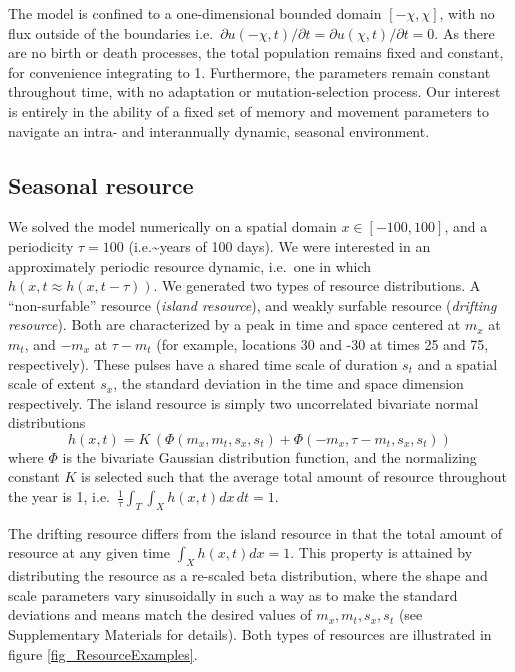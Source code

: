 \documentclass[utf8]{frontiersSCNS} %
\begin{document}
	The model is confined to a one-dimensional bounded domain $[-\chi,\chi]$, with no flux outside of the boundaries i.e.~${\partial u(-\chi,t)}/{\partial t} = {\partial u(\chi,t)}/{\partial t} =0$. As there are no birth or death processes, the total population remains fixed and constant, for convenience integrating to 1. Furthermore, the parameters remain constant throughout time, with no adaptation or mutation-selection process. Our interest is entirely in the ability of a fixed set of memory and movement parameters to navigate an intra- and interannually dynamic, seasonal environment.
	
	\subsection{Seasonal resource}
	
	We solved the model numerically on a spatial domain $x \in [-100,100]$, and a periodicity $\tau = 100$ (i.e.\textasciitilde years of 100 days). We were interested in an approximately periodic resource dynamic, i.e.~one in which $h(x,t \approx h(x, t-\tau))$. We generated two types of resource distributions. A ``non-surfable'' resource (\emph{island resource}), and weakly surfable resource (\emph{drifting resource}). Both are characterized by a peak in time and space centered at $m_x$ at $m_t$, and $-m_x$ at $\tau - m_t$ (for example, locations 30 and -30 at times 25 and 75, respectively). These pulses have a shared time scale of duration $s_t$ and a spatial scale of extent $s_x$, the standard deviation in the time and space dimension respectively. The island resource is simply two uncorrelated bivariate normal
	distributions 
	$$h(x,t) = K\,(\Phi(m_x, m_t, s_x, s_t) + \Phi(-m_x, \tau - m_t, s_x, s_t))$$ 
	\noindent where $\Phi$ is the bivariate Gaussian distribution function, and the normalizing constant $K$ is selected such that the average total amount of resource throughout the year is 1, i.e.~$\frac{1}{\tau} \int_T\int_X h(x,t) dx\,dt = 1$.
	
	The drifting resource differs from the island resource in that the total amount of resource at any given time $\int_X h(x,t) dx = 1$. This property is attained by distributing the resource as a re-scaled beta distribution, where the shape and scale parameters vary sinusoidally in such a way as to make the standard deviations and means match the desired values of $m_x, m_t, s_x, s_t$ (see Supplementary Materials for details). Both types of resources are illustrated in figure \ref{fig_ResourceExamples}.
	
\end{document}

